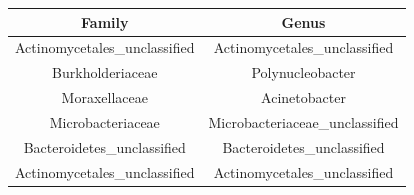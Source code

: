 \documentclass[]{article}
\begin{document}
\begin{longtable}[]{@{}cc@{}}
\toprule
\begin{minipage}[b]{0.41\columnwidth}\centering\strut
Family\strut
\end{minipage} & \begin{minipage}[b]{0.42\columnwidth}\centering\strut
Genus\strut
\end{minipage}\tabularnewline
\midrule
\endhead
\begin{minipage}[t]{0.41\columnwidth}\centering\strut
Actinomycetales\_unclassified\strut
\end{minipage} & \begin{minipage}[t]{0.42\columnwidth}\centering\strut
Actinomycetales\_unclassified\strut
\end{minipage}\tabularnewline
\begin{minipage}[t]{0.41\columnwidth}\centering\strut
Burkholderiaceae\strut
\end{minipage} & \begin{minipage}[t]{0.42\columnwidth}\centering\strut
Polynucleobacter\strut
\end{minipage}\tabularnewline
\begin{minipage}[t]{0.41\columnwidth}\centering\strut
Moraxellaceae\strut
\end{minipage} & \begin{minipage}[t]{0.42\columnwidth}\centering\strut
Acinetobacter\strut
\end{minipage}\tabularnewline
\begin{minipage}[t]{0.41\columnwidth}\centering\strut
Microbacteriaceae\strut
\end{minipage} & \begin{minipage}[t]{0.42\columnwidth}\centering\strut
Microbacteriaceae\_unclassified\strut
\end{minipage}\tabularnewline
\begin{minipage}[t]{0.41\columnwidth}\centering\strut
Bacteroidetes\_unclassified\strut
\end{minipage} & \begin{minipage}[t]{0.42\columnwidth}\centering\strut
Bacteroidetes\_unclassified\strut
\end{minipage}\tabularnewline
\begin{minipage}[t]{0.41\columnwidth}\centering\strut
Actinomycetales\_unclassified\strut
\end{minipage} & \begin{minipage}[t]{0.42\columnwidth}\centering\strut
Actinomycetales\_unclassified\strut

\end{minipage}
\end{longtable}
\end{document}
